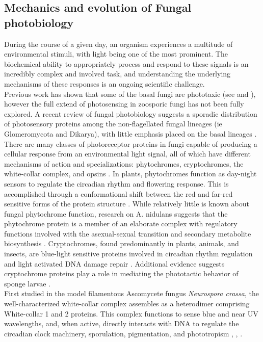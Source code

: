 \subsection{Mechanics and evolution of Fungal photobiology}
\indent During the course of a given day, an organism experiences a multitude of environmental stimuli, with light being one of the most prominent. The biochemical ability to appropriately process and respond to these signals is an incredibly complex and involved task, and understanding the underlying mechanisms of these responses is an ongoing scientific challenge. \\
\indent Previous work has shown that some of the basal fungi are phototaxic (see \cite{Saranak1997} and \cite{Muehlstein1987}), however the full extend of photosensing in zoosporic fungi has not been fully explored. A recent review of fungal photobiology suggests a sporadic distribution of photosensory proteins among the non-flagellated fungal lineages (ie Glomeromycota and Dikarya), with little emphasis placed on the basal lineages \cite{Idnurm2010}. There are many classes of photoreceptor proteins in fungi capable of producing a cellular response from an environmental light signal, all of which have different mechanisms of action and specializations: phytochromes, cryptochromes, the white-collar complex, and opsins \cite{Idnurm2010}. In plants, phytochromes function as day-night sensors to regulate the circadian rhythm and flowering response. This is accomplished through a conformational shift between the red and far-red sensitive forms of the protein structure \cite{Rockwell2006}. While relatively little is known about fungal phytochrome function, research on A. nidulans suggests that the phytochrome protein is a member of an elaborate complex with regulatory functions involved with the asexual-sexual transition and secondary metabolite biosynthesis \cite{Idnurm2010}. Cryptochromes, found predominantly in plants, animals, and insects, are blue-light sensitive proteins involved in circadian rhythm regulation and light activated DNA damage repair \cite{Idnurm et al. 2010}. Additional evidence suggests cryptochrome proteins play a role in mediating the phototactic behavior of sponge larvae \cite{Rivera2012}.\\
\indent First studied in the model filamentous Ascomycete fungus \textit{Neurospora crassa}, the well-characterized white-collar complex assembles as a heterodimer comprising White-collar 1 and 2 proteins. This complex functions to sense blue and near UV wavelengths, and, when active, directly interacts with DNA to regulate the circadian clock machinery, sporulation, pigmentation, and phototropism \cite{Ballario1997}, \cite{Purschwitz2006}, \cite{Corrochano2007}. \\
